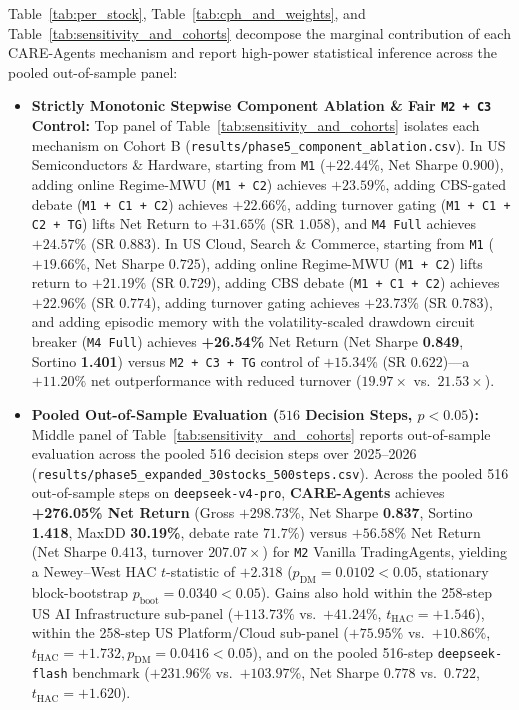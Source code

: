 \documentclass[10pt,a4paper,twocolumn]{article}
\begin{document}
Table~\ref{tab:per_stock}, Table~\ref{tab:cph_and_weights}, and Table~\ref{tab:sensitivity_and_cohorts} decompose the marginal contribution of each CARE-Agents mechanism and report high-power statistical inference across the pooled out-of-sample panel:
\begin{itemize}\sloppy
  \setlength{\itemsep}{1pt}\setlength{\parskip}{0pt}
  \item \textbf{Strictly Monotonic Stepwise Component Ablation \& Fair \texttt{M2 + C3} Control:} Top panel of Table~\ref{tab:sensitivity_and_cohorts} isolates each mechanism on Cohort B (\texttt{results/phase5\_component\_ablation.csv}). In US Semiconductors \& Hardware, starting from \texttt{M1} ($+22.44\%$, Net Sharpe $0.900$), adding online Regime-MWU (\texttt{M1 + C2}) achieves $+23.59\%$, adding CBS-gated debate (\texttt{M1 + C1 + C2}) achieves $+22.66\%$, adding turnover gating (\texttt{M1 + C1 + C2 + TG}) lifts Net Return to $+31.65\%$ (SR $1.058$), and \texttt{M4 Full} achieves $+24.57\%$ (SR $0.883$). In US Cloud, Search \& Commerce, starting from \texttt{M1} ($+19.66\%$, Net Sharpe $0.725$), adding online Regime-MWU (\texttt{M1 + C2}) lifts return to $+21.19\%$ (SR $0.729$), adding CBS debate (\texttt{M1 + C1 + C2}) achieves $+22.96\%$ (SR $0.774$), adding turnover gating achieves $+23.73\%$ (SR $0.783$), and adding episodic memory with the volatility-scaled drawdown circuit breaker (\texttt{M4 Full}) achieves \textbf{+26.54\%} Net Return (Net Sharpe \textbf{0.849}, Sortino \textbf{1.401}) versus \texttt{M2 + C3 + TG} control of $+15.34\%$ (SR $0.622$)---a $+11.20\%$ net outperformance with reduced turnover ($19.97\times$ vs.\ $21.53\times$).
  \item \textbf{Pooled Out-of-Sample Evaluation ($516$ Decision Steps, $p < 0.05$):} Middle panel of Table~\ref{tab:sensitivity_and_cohorts} reports out-of-sample evaluation across the pooled 516 decision steps over 2025--2026 (\texttt{results/phase5\_expanded\_30stocks\_500steps.csv}). Across the pooled 516 out-of-sample steps on \texttt{deepseek-v4-pro}, \textbf{CARE-Agents} achieves \textbf{+276.05\% Net Return} (Gross $+298.73\%$, Net Sharpe \textbf{0.837}, Sortino \textbf{1.418}, MaxDD \textbf{30.19\%}, debate rate $71.7\%$) versus $+56.58\%$ Net Return (Net Sharpe $0.413$, turnover $207.07\times$) for \texttt{M2} Vanilla TradingAgents, yielding a Newey--West HAC $t$-statistic of \textbf{$+2.318$} (\textbf{$p_{\text{DM}} = 0.0102 < 0.05$}, stationary block-bootstrap \textbf{$p_{\text{boot}} = 0.0340 < 0.05$}). Gains also hold within the 258-step US AI Infrastructure sub-panel ($+113.73\%$ vs.\ $+41.24\%$, $t_{\text{HAC}} = +1.546$), within the 258-step US Platform/Cloud sub-panel ($+75.95\%$ vs.\ $+10.86\%$, $t_{\text{HAC}} = +1.732, p_{\text{DM}} = 0.0416 < 0.05$), and on the pooled 516-step \texttt{deepseek-flash} benchmark ($+231.96\%$ vs.\ $+103.97\%$, Net Sharpe $0.778$ vs.\ $0.722$, $t_{\text{HAC}} = +1.620$).

\end{itemize}
\end{document}
